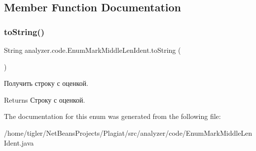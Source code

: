 \subsection{Member Function Documentation}
\mbox{\label{enumanalyzer_1_1code_1_1EnumMarkMiddleLenIdent_a057938ee5095c35298a6c7741f7d0cb3}} 
\subsubsection{\texorpdfstring{to\+String()}{toString()}}
{\footnotesize\ttfamily String analyzer.\+code.\+Enum\+Mark\+Middle\+Len\+Ident.\+to\+String (\begin{DoxyParamCaption}{ }\end{DoxyParamCaption})\hspace{0.3cm}{\ttfamily [inline]}}

Получить строку с оценкой. \begin{DoxyReturn}{Returns}
Строку с оценкой. 
\end{DoxyReturn}


The documentation for this enum was generated from the following file\+:\begin{DoxyCompactItemize}
\item 
/home/tigler/\+Net\+Beans\+Projects/\+Plagiat/src/analyzer/code/Enum\+Mark\+Middle\+Len\+Ident.\+java\end{DoxyCompactItemize}
